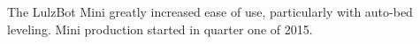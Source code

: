 %
%
%
%
%

The LulzBot Mini greatly increased ease of use, particularly with
auto-bed leveling.
Mini production started in quarter one of 2015.



